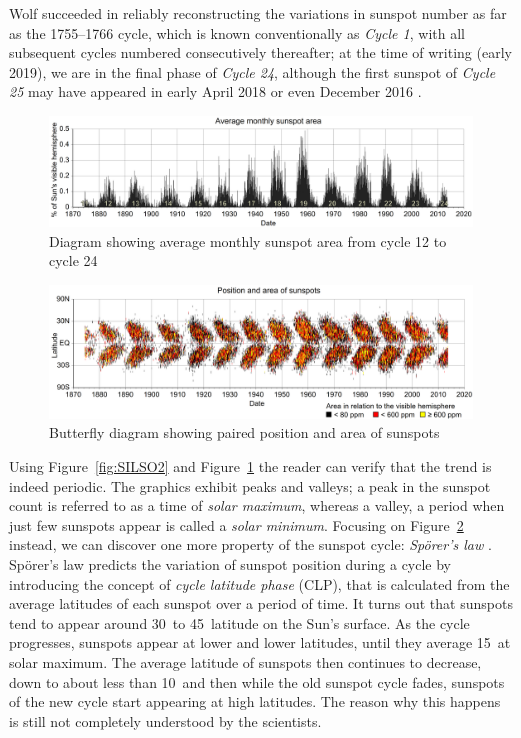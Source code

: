 \bigbreak
\noindent Wolf succeeded in reliably reconstructing the variations in sunspot number as far as the 1755--1766 cycle, which is known conventionally as \textit{Cycle 1}, with all subsequent cycles numbered consecutively thereafter; at the time of writing (early 2019), we are in the final phase of \textit{Cycle 24}, although the first sunspot of \textit{Cycle 25} may have appeared in early April 2018 \cite{cycle25-1}\cite{cycle25-2} or even December 2016 \cite{cycle25-3}.
\begin{figure}[t]
    \centering
    \includegraphics[width=\textwidth]{./pictures/ssarea}
    \caption{Diagram showing average monthly sunspot area from cycle 12 to cycle 24}
    \label{fig:ssarea}
\end{figure}
\begin{figure}[t]
    \centering
    \includegraphics[width=\textwidth]{./pictures/butterfly}
    \caption{Butterfly diagram showing paired position and area of sunspots}
    \label{fig:butterfly}
\end{figure}
\bigbreak
\noindent Using Figure~\ref{fig:SILSO2} and Figure~\ref{fig:ssarea} the reader can verify that the trend is indeed periodic. The graphics exhibit peaks and valleys; a peak in the sunspot count is referred to as a time of \textit{solar maximum}, whereas a valley, a period when just few sunspots appear is called a \textit{solar minimum}.
Focusing on Figure~\ref{fig:butterfly} instead, we can discover one more property of the sunspot cycle: \textit{Sp\"{o}rer's law} \cite{ivanov2014sporer}. Sp\"{o}rer's law predicts the variation of sunspot position during a cycle by introducing the concept of \textit{cycle latitude phase} (CLP), that is calculated from the average latitudes of each sunspot over a period of time. It turns out that sunspots tend to appear around 30\textdegree\ to 45\textdegree\ latitude on the Sun's surface. As the cycle progresses, sunspots appear at lower and lower latitudes, until they average 15\textdegree\ at solar maximum. The average latitude of sunspots then continues to decrease, down to about less than 10\textdegree\ and then while the old sunspot cycle fades, sunspots of the new cycle start appearing at high latitudes. The reason why this happens is still not completely understood by the scientists.
